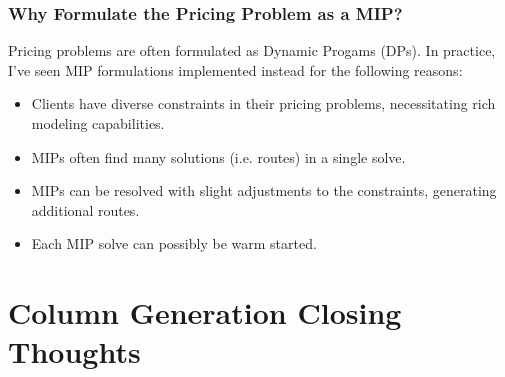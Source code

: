 \documentclass{beamer}
\begin{document}
	\begin{frame}[t]
		\frametitle{Why Formulate the Pricing Problem as a MIP?}
		\small
		\vspace{-.25cm}
		Pricing problems are often formulated as Dynamic Progams (DPs). In practice, I've seen MIP formulations implemented instead for the following reasons:
		\begin{itemize}
			\item Clients have diverse constraints in their pricing problems, necessitating rich modeling capabilities.
			\item MIPs often find many solutions (i.e. routes) in a single solve.
			\item MIPs can be resolved with slight adjustments to the constraints, generating additional routes.
			\item Each MIP solve can possibly be warm started.
		\end{itemize}
		\normalsize
	\end{frame}

	\section{Column Generation Closing Thoughts}
\end{document}
